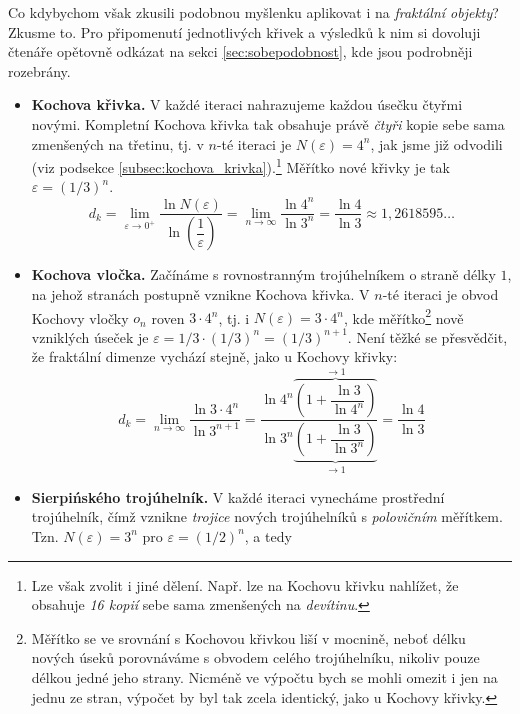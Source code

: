 Co kdybychom však zkusili podobnou myšlenku aplikovat i na \emph{fraktální objekty}? Zkusme to. Pro připomenutí jednotlivých křivek a výsledků k nim si dovoluji čtenáře opětovně odkázat na sekci \ref{sec:sobepodobnost}, kde jsou podrobněji rozebrány.
\begin{itemize}
    \item \textbf{Kochova křivka.} V každé iteraci nahrazujeme každou úsečku čtyřmi novými. Kompletní Kochova křivka tak obsahuje právě \emph{čtyři} kopie sebe sama zmenšených na třetinu, tj. v $n$-té iteraci je $N(\varepsilon)=4^n$, jak jsme již odvodili (viz podsekce \ref{subsec:kochova_krivka}).\footnote{Lze však zvolit i jiné dělení. Např. lze na Kochovu křivku nahlížet, že obsahuje \emph{16 kopií} sebe sama zmenšených na \emph{devítinu}.} Měřítko nové křivky je tak $\varepsilon=(1/3)^n$.
    \begin{equation}\label{eq:kochova-krivka-dimenze}
        d_k=\lim_{\varepsilon\to 0^+}{\dfrac{\ln{N(\varepsilon)}}{\ln{\left(\dfrac{1}{\varepsilon}\right)}}}=\lim_{n\to\infty}{\dfrac{\ln{4^n}}{\ln{3^n}}}=\dfrac{\ln{4}}{\ln{3}}\approx 1{,}2618595\dots
    \end{equation}
    \item \textbf{Kochova vločka.} Začínáme s rovnostranným trojúhelníkem o straně délky $1$, na jehož stranách postupně vznikne Kochova křivka. V $n$-té iteraci je obvod Kochovy vločky $o_n$ roven $3\cdot 4^n$, tj. i $N(\varepsilon)=3\cdot 4^n$, kde měřítko\footnote{Měřítko se ve srovnání s Kochovou křivkou liší v mocnině, neboť délku nových úseků porovnáváme s obvodem celého trojúhelníku, nikoliv pouze délkou jedné jeho strany. Nicméně ve výpočtu bych se mohli omezit i jen na jednu ze stran, výpočet by byl tak zcela identický, jako u Kochovy křivky.} nově vzniklých úseček je $\varepsilon=1/3\cdot(1/3)^n=(1/3)^{n+1}$. Není těžké se přesvědčit, že fraktální dimenze vychází stejně, jako u Kochovy křivky:
    \begin{equation}\label{eq:kochova-vlocka-dimenze}
        d_k=\lim_{n\to\infty}{\dfrac{\ln{3\cdot 4^n}}{\ln{3^{n+1}}}}=\dfrac{\ln{4^n}\overbrace{\left(1+\dfrac{\ln{3}}{\ln{4^n}}\right)}^{\to 1}}{\ln{3^n}\underbrace{\left(1+\dfrac{\ln{3}}{\ln{3^n}}\right)}_{\to 1}}=\dfrac{\ln{4}}{\ln{3}}
    \end{equation}
    \item \textbf{Sierpińského trojúhelník.} V každé iteraci vynecháme prostřední trojúhelník, čímž vznikne \emph{trojice} nových trojúhelníků s \emph{polovičním} měřítkem. Tzn. $N(\varepsilon)=3^n$ pro $\varepsilon=(1/2)^n$, a tedy

\end{itemize}
